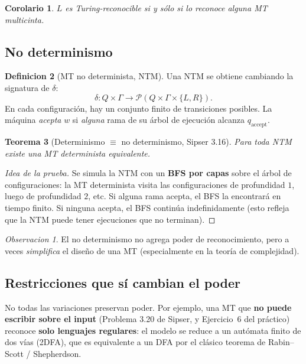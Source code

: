\documentclass[11pt,a4paper]{article}
\theoremstyle{plain}
\newtheorem{teorema}{Teorema}[section]
\newtheorem{corolario}[teorema]{Corolario}
\theoremstyle{definition}
\newtheorem{definicion}[teorema]{Definicion}
\theoremstyle{remark}
\newtheorem*{observacion}{Observacion}
\newcommand{\qaccept}{q_{\text{accept}}}
\newcommand{\Pow}{\mathcal{P}}
\begin{document}
\begin{corolario}
$L$ es Turing-reconocible si y s\'olo si lo reconoce alguna MT multicinta.
\end{corolario}

\subsection{No determinismo}

\begin{definicion}[MT no determinista, NTM]
Una NTM se obtiene cambiando la signatura de $\delta$:
\[
  \delta : Q\times\Gamma \to \Pow(Q\times\Gamma\times\{L,R\}).
\]
En cada configuraci\'on, hay un conjunto finito de transiciones posibles.
La m\'aquina \emph{acepta} $w$ si \emph{alguna} rama de su \'arbol de
ejecuci\'on alcanza $\qaccept$.
\end{definicion}

\begin{teorema}[Determinismo $\equiv$ no determinismo, Sipser 3.16]
Para toda NTM existe una MT determinista equivalente.
\end{teorema}

\begin{proof}[Idea de la prueba]
Se simula la NTM con un \textbf{BFS por capas} sobre el \'arbol de
configuraciones: la MT determinista visita las configuraciones de
profundidad $1$, luego de profundidad $2$, etc. Si alguna rama acepta, el
BFS la encontrar\'a en tiempo finito. Si ninguna acepta, el BFS contin\'ua
indefinidamente (esto refleja que la NTM puede tener ejecuciones que no
terminan).
\end{proof}

\begin{observacion}
El no determinismo no agrega poder de reconocimiento, pero a veces
\emph{simplifica} el dise\~no de una MT (especialmente en la teor\'ia de
complejidad).
\end{observacion}

\subsection{Restricciones que s\'i cambian el poder}

No todas las variaciones preservan poder. Por ejemplo, una MT que
\textbf{no puede escribir sobre el input} (Problema 3.20 de Sipser, y
Ejercicio~6 del pr\'actico) reconoce \textbf{solo lenguajes regulares}: el
modelo se reduce a un aut\'omata finito de dos v\'ias (2DFA), que es
equivalente a un DFA por el cl\'asico teorema de Rabin--Scott /
Shepherdson.
\end{document}
